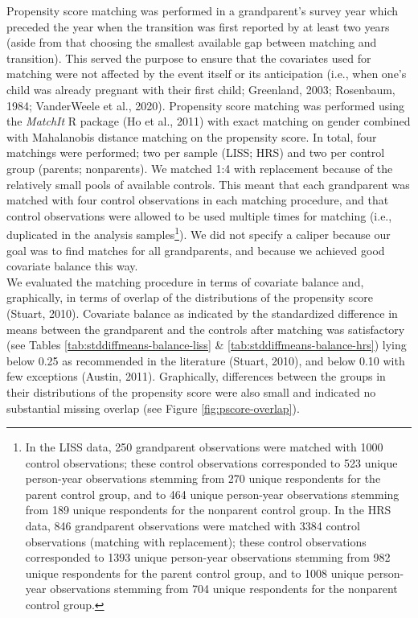 \documentclass[
  english,
  man, noextraspace]{apa7}
\begin{document}
Propensity score matching was performed in a grandparent's survey year which preceded the year when the transition was first reported by at least two years (aside from that choosing the smallest available gap between matching and transition). This served the purpose to ensure that the covariates used for matching were not affected by the event itself or its anticipation (i.e., when one's child was already pregnant with their first child; Greenland, 2003; Rosenbaum, 1984; VanderWeele et al., 2020). Propensity score matching was performed using the \emph{MatchIt} R package (Ho et al., 2011) with exact matching on gender combined with Mahalanobis distance matching on the propensity score. In total, four matchings were performed; two per sample (LISS; HRS) and two per control group (parents; nonparents). We matched 1:4 with replacement because of the relatively small pools of available controls. This meant that each grandparent was matched with four control observations in each matching procedure, and that control observations were allowed to be used multiple times for matching (i.e., duplicated in the analysis samples\footnote{In the LISS data, 250 grandparent observations were matched with 1000 control observations; these control observations corresponded to 523 unique person-year observations stemming from 270 unique respondents for the parent control group, and to 464 unique person-year observations stemming from 189 unique respondents for the nonparent control group. In the HRS data, 846 grandparent observations were matched with 3384 control observations (matching with replacement); these control observations corresponded to 1393 unique person-year observations stemming from 982 unique respondents for the parent control group, and to 1008 unique person-year observations stemming from 704 unique respondents for the nonparent control group.}). We did not specify a caliper because our goal was to find matches for all grandparents, and because we achieved good covariate balance this way.\\
We evaluated the matching procedure in terms of covariate balance and, graphically, in terms of overlap of the distributions of the propensity score (Stuart, 2010). Covariate balance as indicated by the standardized difference in means between the grandparent and the controls after matching was satisfactory (see Tables \ref{tab:stddiffmeans-balance-liss} \& \ref{tab:stddiffmeans-balance-hrs}) lying below 0.25 as recommended in the literature (Stuart, 2010), and below 0.10 with few exceptions (Austin, 2011). Graphically, differences between the groups in their distributions of the propensity score were also small and indicated no substantial missing overlap (see Figure \ref{fig:pscore-overlap}).\\
\end{document}
